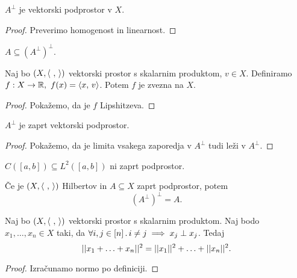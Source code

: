 \begin{trditev}
    \(A^\perp\) je vektorski podprostor v \(X\).
\end{trditev}

\begin{proof}
    Preverimo homogenost in linearnost.
\end{proof}

\begin{opomba}
    \(A \subseteq (A^\perp)^\perp\).
\end{opomba}

\begin{trditev}
    Naj bo \((X, \langle \ , \,  \rangle)\) vektorski prostor s skalarnim produktom, \(v \in X\). Definiramo \(f: X \to \mathbb{R}, \ f(x) = \langle x, \, v \rangle\). Potem \(f\) je zvezna na \(X\).
\end{trditev}

\begin{proof}
    Pokažemo, da je \(f\) Lipshitzeva.
\end{proof}

\begin{posledica}
    \(A^\perp\) je zaprt vektorski podprostor.
\end{posledica}

\begin{proof}
    Pokažemo, da je limita vsakega zaporedja v \(A^\perp\) tudi leži v \(A^\perp\).
\end{proof}

\begin{opomba}
    \(C([a, b]) \subseteq L^2([a,b])\) ni zaprt podprostor.
\end{opomba}

\begin{opomba}
    Če je \((X, \langle \ , \,  \rangle)\) Hilbertov in \(A \subseteq X\) zaprt podprostor, potem \[(A^\perp)^\perp = A.\]
\end{opomba}

\begin{trditev}
    \label{trd:pitagor}
    Naj bo \((X, \langle \ , \,  \rangle)\) vektorski prostor s skalarnim produktom. Naj bodo \(x_1, \ldots, x_n \in X\) taki, da \(\forall i, j \in [n] \,.\, i \neq j \implies x_j \perp x_j\). Tedaj 
    \[||x_1 + \ldots + x_n||^2 = ||x_1||^2 + \ldots + ||x_n||^2.\]
\end{trditev}

\begin{proof}
    Izračunamo normo po definiciji.
\end{proof}

